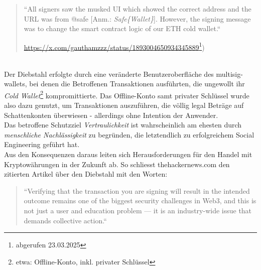 \blockquote[{\url{https://x.com/gauthamzzz/status/1893004650934345889}\footnote{abgerufen 23.03.2025})}]{
    ``All signers saw the musked UI which showed the correct address and the URL was from
    @safe [Anm.: \textit{Safe\{Wallet\}}]. However, the signing message was to change the smart contract logic of our ETH cold wallet.``
}\\

\noindent
Der Diebstahl erfolgte durch eine veränderte Benutzeroberfläche des multisig-wallets, bei denen die Betroffenen Transaktionen ausführten, die ungewollt ihr \textit{Cold Wallet}\footnote{etwa: Offline-Konto, inkl. privater Schlüssel} kompromittierte.
Das Offline-Konto samt privater Schlüssel wurde also dazu genutzt, um Transaktionen auszuführen, die völlig legal Beträge auf Schattenkonten überwiesen - allerdings ohne Intention der Anwender.\\

\noindent
Das betroffene Schutzziel \textit{Vertraulichkeit} ist wahrscheinlich am ehesten durch \textit{menschliche Nachlässigkeit} zu begründen, die letztendlich zu erfolgreichem Social Engineering geführt hat.\\
Aus den Konsequenzen daraus leiten sich Herausforderungen für den Handel mit Kryptowährungen in der Zukunft ab.
So schliesst thehackernews.com den zitierten Artikel über den Diebstahl mit den Worten:

\blockquote[]{
    ``Verifying that the transaction you are signing will result in the intended outcome remains one of the biggest security challenges in Web3, and this is not just a user and education problem — it is an industry-wide issue that demands collective action.``
}
